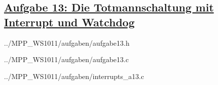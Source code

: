 \subsection
{\href{http://cst.mi.fu-berlin.de/intern/19606-P-MPP/Aufgaben/040402.html}
{Aufgabe 13: Die Totmannschaltung mit Interrupt und Watchdog}}


{../MPP_WS1011/aufgaben/aufgabe13.h}


{../MPP_WS1011/aufgaben/aufgabe13.c}


{../MPP_WS1011/aufgaben/interrupts_a13.c}
